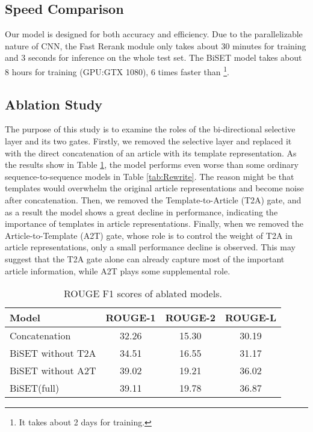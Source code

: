 \documentclass[11pt,a4paper]{article}
\begin{document}
\begin{spacing}{1.0}
\subsection{Speed Comparison} Our model is designed for both accuracy and efficiency. Due to the parallelizable nature of CNN, the Fast Rerank module only takes about 30 minutes for training and 3 seconds for inference on the whole test set. The BiSET model takes about 8 hours for training (GPU:GTX 1080), 6 times faster than  \cite{cao2018retrieve}\footnote{It takes about 2 days for training.}.

\subsection{Ablation Study}
The purpose of this study is to examine the roles of the bi-directional selective layer and its two gates. Firstly, we removed the selective layer and replaced it with the direct concatenation of an article with its template representation. As the results show in Table \ref{tab:Ablation}, the model performs even worse than some ordinary sequence-to-sequence models in Table \ref{tab:Rewrite}. The reason might be that templates would overwhelm the original article representations and become noise after concatenation. Then, we removed the Template-to-Article (T2A) gate, and as a result the model shows a great decline in performance, indicating the importance of templates in article representations. Finally, when we removed the Article-to-Template (A2T) gate, whose role is to control the weight of T2A in article representations, only a small performance decline is observed. This may suggest that the T2A gate alone can already capture most of the important article information, while A2T plays some supplemental role.

\begin{table}[t]
\small
	
	\centering
	\begin{tabular}{@{}l|ccc@{}}
		\toprule
        Model & ROUGE-1   & ROUGE-2  & ROUGE-L  \\
        \hline
        Concatenation  & 32.26 & 15.30 & 30.19 \\
        BiSET without T2A   & 34.51 & 16.55 & 31.17 \\
        BiSET without A2T  & 39.02 & 19.21 & 36.02 \\
        BiSET(full) & 39.11 & 19.78 & 36.87 \\
        \bottomrule
	\end{tabular}
	\caption{ROUGE F1 scores of ablated models.}
\label{tab:Ablation}
\end{table}


\end{spacing}
\end{document}
